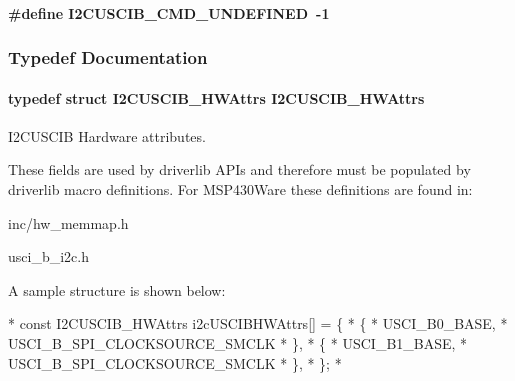 \paragraph[{I2\-C\-U\-S\-C\-I\-B\-\_\-\-C\-M\-D\-\_\-\-U\-N\-D\-E\-F\-I\-N\-E\-D}]{\setlength{\rightskip}{0pt plus 5cm}\#define I2\-C\-U\-S\-C\-I\-B\-\_\-\-C\-M\-D\-\_\-\-U\-N\-D\-E\-F\-I\-N\-E\-D~-\/1}\label{_i2_c_u_s_c_i_b_8h_a21807b856cb66a3bf2f0c2bac0674ce7}


\subsubsection{Typedef Documentation}
\paragraph[{I2\-C\-U\-S\-C\-I\-B\-\_\-\-H\-W\-Attrs}]{\setlength{\rightskip}{0pt plus 5cm}typedef struct {\bf I2\-C\-U\-S\-C\-I\-B\-\_\-\-H\-W\-Attrs}  {\bf I2\-C\-U\-S\-C\-I\-B\-\_\-\-H\-W\-Attrs}}\label{_i2_c_u_s_c_i_b_8h_a83f30e87604a576ba053bea4686c9569}


I2\-C\-U\-S\-C\-I\-B Hardware attributes. 

These fields are used by driverlib A\-P\-Is and therefore must be populated by driverlib macro definitions. For M\-S\-P430\-Ware these definitions are found in\-:
\begin{DoxyItemize}
\item inc/hw\-\_\-memmap.\-h
\item usci\-\_\-b\-\_\-i2c.\-h
\end{DoxyItemize}

A sample structure is shown below\-: 
\begin{DoxyCode}
*  \textcolor{keyword}{const} I2CUSCIB_HWAttrs i2cUSCIBHWAttrs[] = \{
*      \{
*          USCI\_B0\_BASE,
*          USCI\_B\_SPI\_CLOCKSOURCE\_SMCLK
*      \},
*      \{
*          USCI\_B1\_BASE,
*          USCI\_B\_SPI\_CLOCKSOURCE\_SMCLK
*      \},
*  \};
*  
\end{DoxyCode}
